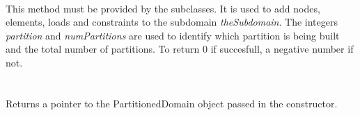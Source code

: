  \\
This method must be provided by the subclasses. It is used to add
nodes, elements, loads and constraints to the subdomain {\em
theSubdomain}. The integers {\em partition} and {\em numPartitions}
are used to identify which partition is being built and the total
number of partitions. To return $0$ if succesfull, a negative number
if not. \\


 \\
 \\
Returns a pointer to the PartitionedDomain object passed in the constructor.\\



